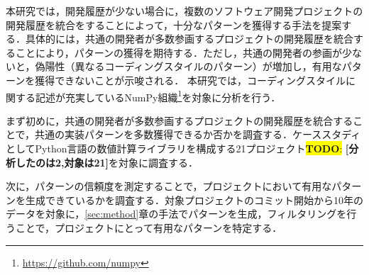 \documentclass[T,J]{fose} %
\newcommand{\todo}[1]{\colorbox{yellow}{{\bf TODO}:}{\color{red} {\textbf{[#1]}}}}
\newcommand{\rqtwo}{パターンマッチによって収集されたパターンの信頼度はどの程度か}
\begin{document}

本研究では，開発履歴が少ない場合に，複数のソフトウェア開発プロジェクトの開発履歴を統合をすることによって，十分なパターンを獲得する手法を提案する．具体的には，共通の開発者が多数参画するプロジェクトの開発履歴を統合することにより，パターンの獲得を期待する．ただし，共通の開発者の参画が少ないと，偽陽性（異なるコーディングスタイルのパターン）が増加し，有用なパターンを獲得できないことが示唆される．
本研究では，コーディングスタイルに関する記述が充実しているNumPy組織\footnote{\url{https://github.com/numpy}}を対象に分析を行う．

まず初めに，共通の開発者が多数参画するプロジェクトの開発履歴を統合することで，共通の実装パターンを多数獲得できるか否かを調査する．ケーススタディとしてPython言語の数値計算ライブラリを構成する21プロジェクト\todo{分析したのは2,対象は21}を対象に調査する．


次に，パターンの信頼度を測定することで，プロジェクトにおいて有用なパターンを生成できているかを調査する．対象プロジェクトのコミット開始から10年のデータを対象に，\ref{sec:method}章の手法でパターンを生成，フィルタリングを行うことで，プロジェクトにとって有用なパターンを特定する．
\end{document}
